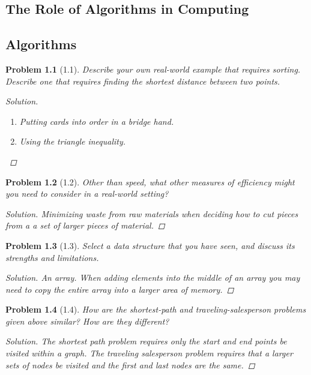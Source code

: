 \documentclass[oneside]{book}
\newtheorem{problem}{Problem}
\begin{document}
\mainmatter
\begin{spacing}{1.618}
\chapter{The Role of Algorithms in Computing}
\section{Algorithms}

\begin{problem}[1.1]
Describe your own real-world example that requires sorting. Describe one that requires finding the shortest distance between two points.
\begin{proof}[Solution] \ \par
	\begin{enumerate}
		\item Putting cards into order in a bridge hand. 
		\item Using the triangle inequality. 
	\end{enumerate}
\end{proof}
\end{problem}

\begin{problem}[1.2]
	Other than speed, what other measures of efficiency might you need to consider in a real-world setting?
	\begin{proof}[Solution]
		Minimizing waste from raw materials when deciding how to cut pieces from a a set of larger pieces of material. 
	\end{proof}
\end{problem}

\begin{problem}[1.3]
	Select a data structure that you have seen, and discuss its strengths and limitations.
	\begin{proof}[Solution]
		An array. When adding elements into the middle of an array you may need to copy the entire array into a larger area of memory. 
	\end{proof}
\end{problem}

\begin{problem}[1.4]
	How are the shortest-path and traveling-salesperson problems given above similar?
	How are they different?
	\begin{proof}[Solution]
		The shortest path problem requires only the start and end points be visited within a graph. The traveling salesperson problem requires that a larger sets of nodes be visited and the first and last nodes are the same. 
	\end{proof}
\end{problem}


\end{spacing}
\end{document}
